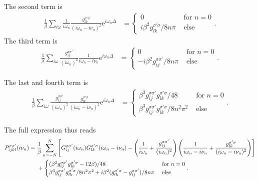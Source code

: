 \documentclass[12pt,a4paper]{scrartcl}
\numberwithin{equation}{section}
\begin{document}
The second term is
\begin{align}
\frac{1}{\beta} \sum_{i\omega} \frac{1}{i\omega_n}\frac{g^{\sigma'\sigma}_{lk}}{(i\omega_n-i\nu_n)^2} \mathrm{e}^{i\omega_n\Delta}
&= \begin{cases}
    0 & \mbox{ for } n=0 \\
    i \beta^2 g^{\sigma'\sigma}_{lk} / 8n\pi & \mbox{ else}
   \end{cases}.
\end{align}
The third term is
\begin{align}
\frac{1}{\beta} \sum_{i\omega} \frac{g^{\sigma\sigma'}_{ij}}{(i\omega_n)^2}\frac{1}{i\omega_n-i\nu_n} \mathrm{e}^{i\omega_n\Delta}
&= \begin{cases}
    0 & \mbox{ for } n=0 \\
    -i \beta^2 g^{\sigma\sigma'}_{ij} / 8n\pi & \mbox{ else}
   \end{cases}.
\end{align}

The last and fourth term is
\begin{align}
\frac{1}{\beta} \sum_{i\omega} \frac{g^{\sigma\sigma'}_{ij}}{(i\omega_n)^2}\frac{g^{\sigma'\sigma}_{lk}}{(i\omega_n-i\nu_n)^2} \mathrm{e}^{i\omega_n\Delta}
&= \begin{cases}
    \beta^3 g^{\sigma\sigma'}_{ij}g^{\sigma'\sigma}_{lk}/48 & \mbox{ for } n=0 \\
    \beta^3 g^{\sigma\sigma'}_{ij}g^{\sigma'\sigma}_{lk}/8n^2\pi^2 & \mbox{ else}
   \end{cases}.
\end{align}

The full expression thus reads
\begin{align}
 P^{\sigma\sigma'}_{ijkl}(i\nu_n)
%
 &=\frac{1}{\beta} \sum_{n=-N}^{N}\left[ G^{\sigma\sigma'}_{ij}(i\omega_n)
                                   G^{\sigma'\sigma}_{lk}(i\omega_n-i\nu_n)
           -\left( \frac{1}{i\omega_n} + \frac{g^{\sigma\sigma'}_{ij}}{(i\omega_n)^2}\right)
            \left(\frac{1}{i\omega_n-i\nu_n} + \frac{g^{\sigma'\sigma}_{lk}}{(i\omega_n-i\nu_n)^2}\right)\right] \nonumber \\
%
&\hspace{0.5cm}+ 
\begin{cases}
  (\beta^3 g^{\sigma\sigma'}_{ij}g^{\sigma'\sigma}_{lk} - 12\beta)/48 & \mbox{ for } n=0 \\
  \beta^3 g^{\sigma\sigma'}_{ij}g^{\sigma'\sigma}_{lk}/8n^2\pi^2
  + i \beta^2 (g^{\sigma'\sigma}_{lk}-g^{\sigma\sigma'}_{ij}) / 8n\pi & \mbox{ else} 
\end{cases}.
\end{align}
\end{document}
